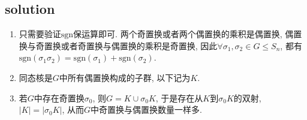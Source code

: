 \documentclass[UTF-8]{ctexart}
\begin{document}
\subsection{solution}
\begin{enumerate}
	\item 只需要验证$\text{sgn}$保运算即可. 两个奇置换或者两个偶置换的乘积是偶置换, 偶置换与奇置换或者奇置换与偶置换的乘积是奇置换, 因此$\forall \sigma_1, \sigma_2 \in G \le S_n$, 都有$\text{sgn}(\sigma_1\sigma_2) = \text{sgn}(\sigma_1) + \text{sgn}(\sigma_2)$.
	\item 同态核是$G$中所有偶置换构成的子群, 以下记为$K$.
	\item 若$G$中存在奇置换$\sigma_0$, 则$G = K \cup \sigma_0K$, 于是存在从$K$到$\sigma_0K$的双射, $|K| = |\sigma_0K|$, 从而$G$中奇置换与偶置换数量一样多.
\end{enumerate}
\end{document}
